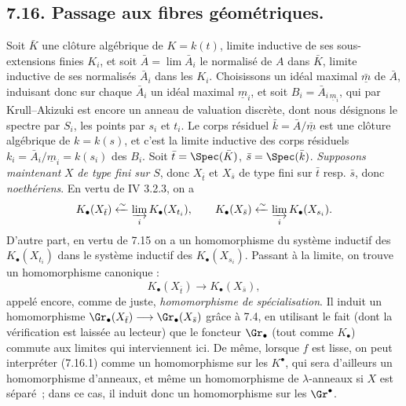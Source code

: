 
\subsection*{7.16. Passage aux fibres géométriques.}
Soit \(\bar K\) une clôture algébrique de \(K=k(t)\), limite inductive de ses sous-extensions finies \(K_i\), et soit \(\bar A=\lim \bar A_i\) le normalisé de \(A\) dans \(\bar K\), limite inductive de ses normalisés \(\bar A_i\) dans les \(K_i\). Choisissons un idéal maximal \(\bar{\underline{m}}\) de \(\bar A\), induisant donc sur chaque \(\bar A_i\) un idéal maximal \(\underline{m}_i\), et soit \(B_i=\bar A_{i\,\underline{m}_i}\), qui par Krull--Akizuki est encore un anneau de valuation discrète, dont nous désignons le spectre par \(S_i\), les points par \(s_i\) et \(t_i\). Le corps résiduel \(\bar k=\bar A/\bar{\underline{m}}\) est une clôture algébrique de \(k=k(s)\), et c'est la limite inductive des corps résiduels \(k_i=\bar A_i/\underline{m}_i=k(s_i)\) des \(B_i\). Soit \(\bar t=\Spec(\bar K)\), \(\bar s=\Spec(\bar k)\). \emph{Supposons maintenant} \(X\) \emph{de type fini sur} \(S\), donc \(X_{\bar t}\) et \(X_{\bar s}\) de type fini sur \(\bar t\) resp. \(\bar s\), donc \emph{noethériens}. En vertu de IV 3.2.3, on a
\[
  K_\bullet(X_{\bar t})\xleftarrow{\sim}\varinjlim_i K_\bullet(X_{t_i}),
  \qquad
  K_\bullet(X_{\bar s})\xleftarrow{\sim}\varinjlim_i K_\bullet(X_{s_i}).
\]
D'autre part, en vertu de 7.15 on a un homomorphisme du système inductif des \(K_\bullet(X_{t_i})\) dans le système inductif des \(K_\bullet(X_{s_i})\). Passant à la limite, on trouve un homomorphisme canonique :
\begin{equation}\tag{7.16.1}
  K_\bullet(X_{\bar t})\longrightarrow K_\bullet(X_{\bar s}),
\end{equation}
appelé encore, comme de juste, \emph{homomorphisme de spécialisation}. Il induit un homomorphisme \(\Gr_\bullet(X_{\bar t})\longrightarrow \Gr_\bullet(X_{\bar s})\) grâce à 7.4, en utilisant le fait (dont la vérification est laissée au lecteur) que le foncteur \(\Gr_\bullet\) (tout comme \(K_\bullet\)) commute aux limites qui interviennent ici. De même, lorsque \(f\) est lisse, on peut interpréter (7.16.1) comme un homomorphisme sur les \(K^\bullet\), qui sera d'ailleurs un homomorphisme d'anneaux, et même un homomorphisme de \(\lambda\)-anneaux si \(X\) est séparé~; dans ce cas, il induit donc un homomorphisme sur les \(\Gr^\bullet\).

